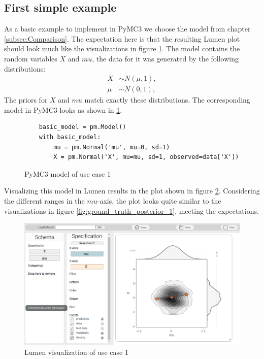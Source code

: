 \documentclass{article}
\begin{document}
\subsection{First simple example}
As a basic example to implement in PyMC3 we choose the model from chapter \ref{subsec:Comparison}. The expectation here is that the resulting Lumen plot should look much like the visualizations in figure \ref{fig:code_use_case_1}. The model contains the random variables $X$ and $mu$, the data for it was generated by the following  distributions:
\begin{equation}
\begin{split}
X &\sim N(\mu,1), \\
\mu &\sim N(0,1),
\end{split}
\end{equation}
The priors for $X$ and $mu$ match exactly these distributions. The corresponding model in PyMC3 looks as shown in \ref{fig:code_use_case_1}.
\begin{figure}[h]
	\begin{lstlisting}
    basic_model = pm.Model()
	with basic_model:
		mu = pm.Normal('mu', mu=0, sd=1)
		X = pm.Normal('X', mu=mu, sd=1, observed=data['X'])
	\end{lstlisting}
	\caption[PyMC3 model of use case 1]{PyMC3 model of use case 1}
	\label{fig:code_use_case_1}
\end{figure}
Visualizing this model in Lumen results in the plot shown in figure \ref{fig:lumen_use_case_1}. Considering the different ranges in the $mu$-axis, the plot looks quite similar to the visualizations in figure \ref{fig:ground_truth_posterior_1}, meeting the expectations.
\begin{figure}
	\includegraphics[width=\textwidth]{images/lumen_use_case_1.png}
	\caption{Lumen visualization of use case 1}
	\label{fig:lumen_use_case_1}
\end{figure}
\end{document}
